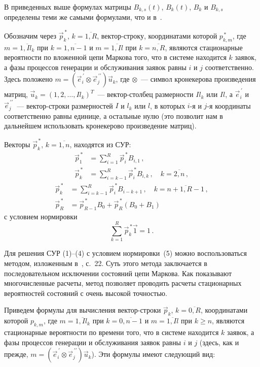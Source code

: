 \begin{multicols}{2}

В приведенных выше формулах матрицы $B_{k,s}(t)$, $B_k(t)$,
$B_k$ и $B_{k,s}$ определены теми же самыми формулами, что
и в~\cite{PSCh06}.

Обозначим через $\vec p_k^{\,*}$, $k=\overline{1,R}$, вектор-строку,
координатами которой
$p_{k,m}^{\,*}$, где $m=\overline{1,I l_k}$ при $k=\overline{1,n-1}$ и
$m=\overline{1,Il}$ при $k=\overline{n,R}$, являются стационарные
вероятности
по вложенной
цепи Маркова того, что в системе находится $k$ заявок, а фазы процессов
генерации и обслуживания заявок равны $i$ и $j$ соответственно.
Здесь положено
$m=(\vec e^{\,\prime}_i\otimes \vec e^{\,\prime\prime}_j) \vec u_k$, где
$\otimes$~--- символ кронекерова произведения матриц,
$\vec u_k=(1,2,\ldots,Il_k)^T$~--- вектор-столбец размерности $Il_k$ или
$Il$, а $\vec e^{\,\prime}_i$ и $\vec e^{\,\prime\prime}_j$~---
вектор-строки
размерностей $I$ и $l_k$ или $l$, в которых $i$-я и $j$-я координаты
соответственно равны единице, а остальные нулю (это позволит нам в
дальнейшем
использовать кронекерово произведение матриц).

Векторы $\vec p^{\,*}_{k}$, $k=\overline{1,n}$, находятся из СУР:
\begin{align}
\label{ES_1}
\vec p_1^{\,*} & =
\sum\limits_{i=1}^{R}
\vec p_i^{\,*} B_{i,1}\,,\\
\vec p_k^{\,*} &= \sum\limits_{i=k-1}^{R} \vec p_i^{\,*} B_{i,k}\,, \quad 
k=\overline{2,n}\,,
\end{align}
\begin{align}
\vec p_k^{\,*} & = \sum\limits_{i=k-1}^{R} \vec p_i^{\,*} B_{i-k+1}\,, \quad 
k=\overline{n+1,R-1}\,,\\
\vec p_{R}^{\,*} & = \vec p_{R-1}^{\,*} B_0 + \vec p_{R}^{\,*} (B_0+B_1)
\end{align}
с условием нормировки
\begin{equation}
\sum\limits_{k=1}^{R} \vec p^{\,*}_k \vec1 = 1\,.
\end{equation}

Для решения СУР (1)--(4) с условием нормировки~(5) можно
воспользоваться методом, изложенным в~\cite{BDPS04}, с.~22.
Суть этого метода заключается в последовательном исключении
состояний цепи Маркова. Как показывают многочисленные расчеты,
метод позволяет проводить расчеты стационарных вероятностей
состояний с очень высокой точностью.

Приведем формулы для вычисления вектор-строки $\vec p_k$,
$k=\overline{0,R}$, координатами которой $p_{k,m}$, где
$m=\overline{1,Il_k}$
при $k=\overline{0,n-1}$ и $m=\overline{1,Il}$ при $k\geq n$, являются
стационарные
вероятности по времени того, что в системе находится $k$ заявок, а фазы
процессов генерации и обслуживания заявок равны $i$ и $j$ (здесь, как и прежде,
$m=(\vec e^{\,\prime}_i\otimes \vec e^{\,\prime\prime}_j)\vec u_k$).
Эти формулы имеют следующий вид:


\end{multicols}
